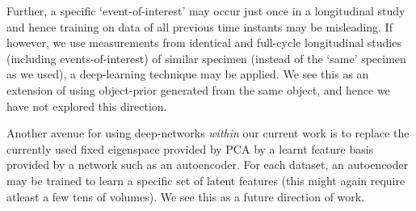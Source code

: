 \documentclass{article}
\begin{document}
\begin{itemize}
\begin{itemize}
  Further, a specific `event-of-interest' may occur just once in a
  longitudinal study and hence training on data of all previous time
  instants may be misleading. If however, we use measurements from
  identical and full-cycle longitudinal studies (including
  events-of-interest) of similar specimen (instead of the `same'
  specimen as we used), a deep-learning technique may be applied. We
  see this as an extension of using object-prior generated from the
  same object, and hence we have not explored this direction.

  Another avenue for using deep-networks \textit{within} our current
  work is to replace the currently used fixed eigenspace provided by
  PCA by a learnt feature basis provided by a network such as an
  autoencoder. For each dataset, an autoencoder may be trained to
  learn a specific set of latent features (this might again require
  atleast a few tens of volumes). We see this as a future direction of
  work.
\end{itemize}
  
  
\end{itemize}
\end{document}
